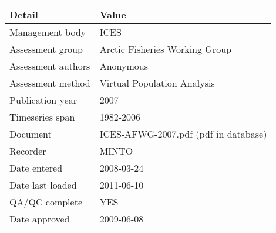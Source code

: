 \begin{table}[htb]
\centering
\begin{tabular}{lp{7cm}}
\toprule
Detail & Value \\
\midrule
Management body    & ICES                                 \\
Assessment group   & Arctic Fisheries Working Group       \\
Assessment authors & Anonymous                            \\
Assessment method  & Virtual Population Analysis          \\
Publication year   & 2007                                 \\
Timeseries span    & 1982-2006                            \\
Document           & ICES-AFWG-2007.pdf (pdf in database) \\
Recorder           & MINTO                                \\
Date entered       & 2008-03-24                           \\
Date last loaded   & 2011-06-10                           \\
QA/QC complete     & YES                                  \\
Date approved      & 2009-06-08                           \\
\bottomrule
\end{tabular}
\label{tab:assessdet}
\end{table}
